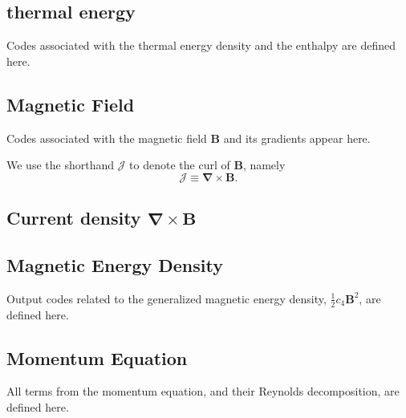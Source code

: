 \documentclass[10pt,letterpaper]{article}
\begin{document}
\subsection{thermal energy}
Codes associated with the thermal energy density and the enthalpy are defined here. 




\subsection{Magnetic Field}
Codes associated with the magnetic field $\boldsymbol{B}$ and its gradients appear here.






We use the shorthand $\boldsymbol{\mathcal{J}}$ to denote the curl of $\boldsymbol{B}$, namely
\begin{equation}
	\boldsymbol{\mathcal{J}}\equiv\boldsymbol{\nabla}\times\boldsymbol{B}.
\end{equation}
\subsection{Current density $\boldsymbol{\nabla}\times\boldsymbol{B}$}




\subsection{Magnetic Energy Density}
Output codes related to the generalized magnetic energy density, $\frac{1}{2}c_4\boldsymbol{B}^2$, are defined here.




\subsection{Momentum Equation}
All terms from the momentum equation, and their Reynolds decomposition, are defined here.




\end{document}
